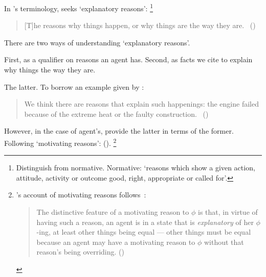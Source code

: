 \begin{note}
  In \citeauthor{Hieronymi:2011aa}'s terminology, \qWhy{} seeks `explanatory reasons':
  \footnote{
    Distinguish from normative.
    Normative: `reasons which show a given action, attitude, activity or outcome good, right, appropriate or called for'.
  }

  \begin{quote}
    [T]he reasons why things happen, or why things are the way they are.%
    \mbox{ }\hfill\mbox{(\citeyear[410]{Hieronymi:2011aa})}
  \end{quote}

  There are two ways of understanding `explanatory reasons'.

  First, as a qualifier on reasons an agent has.
  Second, as facts we cite to explain why things the way they are.

  The latter.
  To borrow an example given by \citeauthor{Hieronymi:2011aa}:

  \begin{quote}
    We think there are reasons that explain such happenings: the engine failed because of the extreme heat or the faulty construction.%
    \mbox{ }\hfill\mbox{(\citeyear{Hieronymi:2011aa})}
  \end{quote}

  However, in the case of agent's, provide the latter in terms of the former.
  Following \citeauthor{Hieronymi:2011aa} `motivating reasons': 
  (\citeyear[411--412]{Hieronymi:2011aa}).%
  \footnote{
     \citeauthor{Hieronymi:2011aa}'s account of motivating reasons follows~\citeauthor{Smith:1994wo}:

    \begin{quote}
      The distinctive feature of a motivating reason to \(\phi\) is that, in virtue of having such a reason, an agent is in a state that is \emph{explanatory} of her \(\phi\)-ing, at least other things being equal --- other things must be equal because an agent may have a motivating reason to \(\phi\) without that reason's being overriding.%
      \mbox{}\hfill\mbox{(\citeyear{Smith:1994wo})}
    \end{quote}
  }
\end{note}

